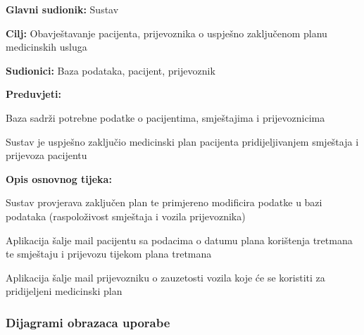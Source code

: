 					\noindent {}
					\begin{packed_item}
						\item \textbf{Glavni sudionik:} Sustav
						\item  \textbf{Cilj:} Obavještavanje pacijenta, prijevoznika o uspješno zaključenom planu medicinskih usluga
						\item  \textbf{Sudionici:} Baza podataka, pacijent, prijevoznik
						\item  \textbf{Preduvjeti:}
						\item[] \begin{packed_enum}
							\item Baza sadrži potrebne podatke o pacijentima, smještajima i prijevoznicima
							\item Sustav je uspješno zaključio medicinski plan pacijenta pridijeljivanjem smještaja i prijevoza pacijentu
						\end{packed_enum}
						
						\item  \textbf{Opis osnovnog tijeka:}
						\item[] \begin{packed_enum}
							\item Sustav provjerava zaključen plan te primjereno modificira podatke u bazi podataka (raspoloživost smještaja i vozila prijevoznika)
							\item Aplikacija šalje mail pacijentu sa podacima o datumu plana korištenja tretmana te smještaju i prijevozu tijekom plana tretmana
							\item Aplikacija šalje mail prijevozniku o zauzetosti vozila koje će se koristiti za pridijeljeni medicinski plan
						\end{packed_enum}
					\end{packed_item}
				\break
					
				\subsubsection{Dijagrami obrazaca uporabe}

